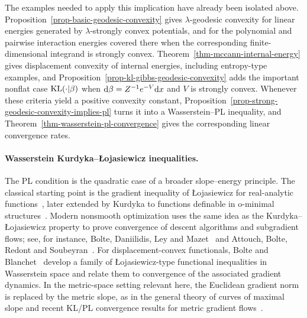 \begin{rem}\label{rem-classical-convexity-rates}
	The examples needed to apply this implication have already been isolated above. Proposition~\ref{prop-basic-geodesic-convexity} gives \(\lambda\)-geodesic convexity for linear energies generated by \(\lambda\)-strongly convex potentials, and for the polynomial and pairwise interaction energies covered there when the corresponding finite-dimensional integrand is strongly convex. Theorem~\ref{thm-mccann-internal-energy} gives displacement convexity of internal energies, including entropy-type examples, and Proposition~\ref{prop-kl-gibbs-geodesic-convexity} adds the important nonflat case \(\operatorname{KL}(\cdot|\beta)\) when \(\mathrm{d}\beta=Z^{-1}e^{-V}\mathrm{d} x\) and \(V\) is strongly convex. Whenever these criteria yield a positive convexity constant, Proposition~\ref{prop-strong-geodesic-convexity-implies-pl} turns it into a Wasserstein--PL inequality, and Theorem~\ref{thm-wasserstein-pl-convergence} gives the corresponding linear convergence rates.
\end{rem}

\paragraph{Wasserstein Kurdyka--{\L}ojasiewicz inequalities.}
The PL condition is the quadratic case of a broader slope--energy principle. The classical starting point is the gradient inequality of {\L}ojasiewicz for real-analytic functions~\cite{Lojasiewicz1963GradientInequality}, later extended by Kurdyka to functions definable in o-minimal structures~\cite{Kurdyka1998GradientsDefinable}. Modern nonsmooth optimization uses the same idea as the Kurdyka--{\L}ojasiewicz property to prove convergence of descent algorithms and subgradient flows; see, for instance, Bolte, Daniilidis, Ley and Mazet~\cite{BolteDaniilidisLeyMazet2010Lojasiewicz} and Attouch, Bolte, Redont and Soubeyran~\cite{attouch-2010}. For displacement-convex functionals, Bolte and Blanchet~\cite{BolteBlanchet2018LojasiewiczDisplacementConvex} develop a family of {\L}ojasiewicz-type functional inequalities in Wasserstein space and relate them to convergence of the associated gradient dynamics. In the metric-space setting relevant here, the Euclidean gradient norm is replaced by the metric slope, as in the general theory of curves of maximal slope and recent KL/PL convergence results for metric gradient flows~\cite{HauerMazon2019KLSMetric,DelloSchiavoMaasPedrotti2023LocalConditions}.

